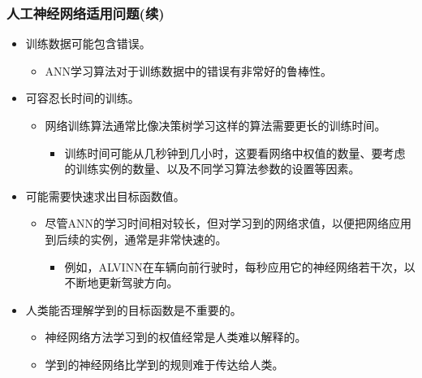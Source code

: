 \documentclass{beamer}
\begin{document}
\begin{frame}
\frametitle{人工神经网络适用问题(续)}
\label{sec-1-7}

\begin{itemize}
\item 训练数据可能包含错误。
\begin{itemize}
\item ANN学习算法对于训练数据中的错误有非常好的鲁棒性。
\end{itemize}
\item 可容忍长时间的训练。
\begin{itemize}
\item 网络训练算法通常比像决策树学习这样的算法需要更长的训练时间。
\begin{itemize}
\item 训练时间可能从几秒钟到几小时，这要看网络中权值的数量、要考虑的训练实例的数量、以及不同学习算法参数的设置等因素。
\end{itemize}
\end{itemize}
\item 可能需要快速求出目标函数值。
\begin{itemize}
\item 尽管ANN的学习时间相对较长，但对学习到的网络求值，以便把网络应用到后续的实例，通常是非常快速的。
\begin{itemize}
\item 例如，ALVINN在车辆向前行驶时，每秒应用它的神经网络若干次，以不断地更新驾驶方向。
\end{itemize}
\end{itemize}
\item 人类能否理解学到的目标函数是不重要的。
\begin{itemize}
\item 神经网络方法学习到的权值经常是人类难以解释的。
\item 学到的神经网络比学到的规则难于传达给人类。
\end{itemize}
\end{itemize}
\end{frame}
\end{document}
